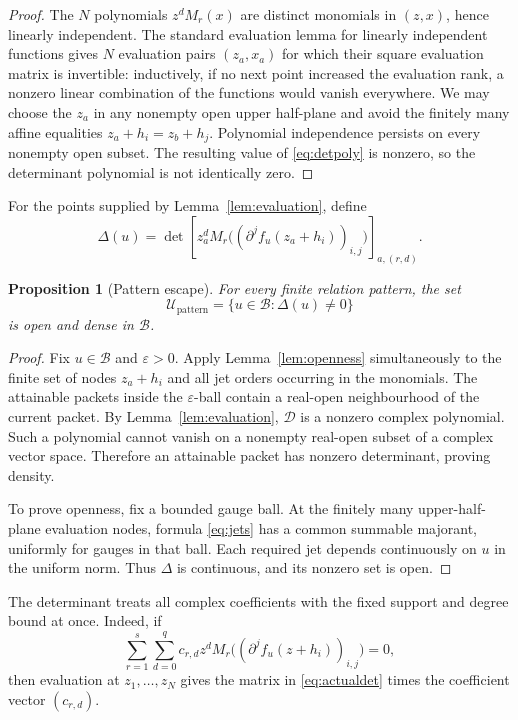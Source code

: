 \documentclass[11pt]{article}
\newtheorem{proposition}[theorem]{Proposition}
\newcommand{\cB}{\mathcal B}
\newcommand{\cU}{\mathcal U}
\newcommand{\D}{\partial}
\begin{document}
\begin{proof}
The $N$ polynomials $z^dM_r(x)$ are distinct monomials in $(z,x)$, hence linearly independent.
The standard evaluation lemma for linearly independent functions gives $N$ evaluation pairs
$(z_a,x_a)$ for which their square evaluation matrix is invertible: inductively, if no next point
increased the evaluation rank, a nonzero linear combination of the functions would vanish
everywhere.  We may choose the $z_a$ in any nonempty open upper half-plane and avoid the finitely
many affine equalities $z_a+h_i=z_b+h_j$.  Polynomial independence persists on every nonempty
open subset.  The resulting value of \eqref{eq:detpoly} is nonzero, so the determinant polynomial
is not identically zero.
\end{proof}

For the points supplied by Lemma~\ref{lem:evaluation}, define
\begin{equation}\label{eq:actualdet}
  \Delta(u)=\det\left[
    z_a^dM_r\bigl((\D^jf_u(z_a+h_i))_{i,j}\bigr)
  \right]_{a,(r,d)}.
\end{equation}

\begin{proposition}[Pattern escape]\label{prop:escape}
For every finite relation pattern, the set
\[
  \cU_{\mathrm{pattern}}=\{u\in\cB:\Delta(u)\ne0\}
\]
is open and dense in $\cB$.
\end{proposition}

\begin{proof}
Fix $u\in\cB$ and $\varepsilon>0$.  Apply Lemma~\ref{lem:openness} simultaneously to the finite
set of nodes $z_a+h_i$ and all jet orders occurring in the monomials.  The attainable packets
inside the $\varepsilon$-ball contain a real-open neighbourhood of the current packet.  By
Lemma~\ref{lem:evaluation}, $\mathcal D$ is a nonzero complex polynomial.  Such a polynomial
cannot vanish on a nonempty real-open subset of a complex vector space.  Therefore an attainable
packet has nonzero determinant, proving density.

To prove openness, fix a bounded gauge ball.  At the finitely many upper-half-plane evaluation
nodes, formula \eqref{eq:jets} has a common summable majorant, uniformly for gauges in that ball.
Each required jet depends continuously on $u$ in the uniform norm.  Thus $\Delta$ is continuous,
and its nonzero set is open.
\end{proof}

The determinant treats all complex coefficients with the fixed support and degree bound at once.
Indeed, if
\begin{equation}\label{eq:relation-pattern}
  \sum_{r=1}^s\sum_{d=0}^q c_{r,d}z^d
  M_r\bigl((\D^jf_u(z+h_i))_{i,j}\bigr)=0,
\end{equation}
then evaluation at $z_1,\ldots,z_N$ gives the matrix in \eqref{eq:actualdet} times the coefficient
vector $(c_{r,d})$.
\end{document}
